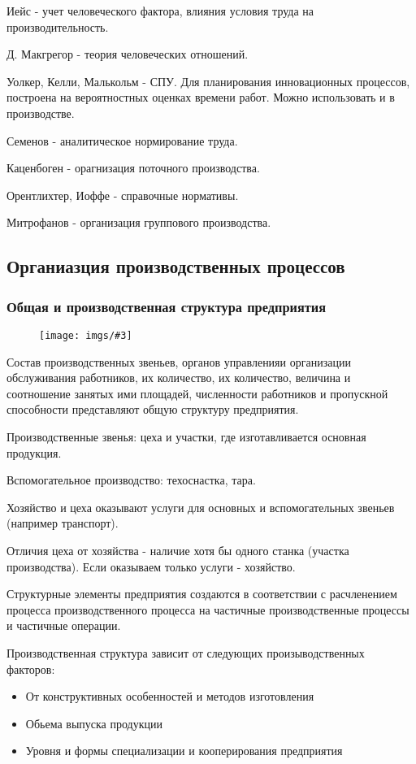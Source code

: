 \documentclass[14pt,a4paper,oneside]{extarticle}
\newcommand{\pic}[3]{
	\begin{figure}[#1]
		\begin{center}
			\texttt{[image: imgs/\#3]}
		\end{center}
	\end{figure}
}
\begin{document}
Иейс - учет человеческого фактора, влияния условия труда на производительность.

Д. Макгрегор - теория человеческих отношений.

Уолкер, Келли, Малькольм - СПУ. Для планирования инновационных процессов, построена на вероятностных оценках времени работ. Можно использовать и в производстве.

Семенов - аналитическое нормирование труда.

Каценбоген - орагнизация поточного производства.

Орентлихтер, Иоффе - справочные нормативы.

Митрофанов - организация группового производства.

\subsection{Органиазция производственных процессов}

\subsubsection{Общая и производственная структура предприятия}

\pic{H}{\textwidth}{1}

Состав производственных звеньев, органов управленияи организации обслуживания работников, их количество, их количество, величина и соотношение занятых ими площадей, численности работников и пропускной способности представляют общую структуру предприятия.

Производственные звенья: цеха и участки, где изготавливается основная продукция.

Вспомогательное производство: техоснастка, тара.

Хозяйство и цеха оказывают услуги для основных и вспомогательных звеньев (например транспорт).

Отличия цеха от хозяйства - наличие хотя бы одного станка (участка производства). Если оказываем только услуги - хозяйство.

Структурные элементы предприятия создаются в соответствии с расчленением процесса производственного процесса на частичные производственные процессы и частичные операции.

Производственная структура зависит от следующих произыводственных факторов:

\begin{itemize}
    \item От конструктивных особенностей и методов изготовления 
    \item Обьема выпуска продукции 
    \item Уровня и формы специализации и кооперирования предприятия
\end{itemize}
\end{document}
